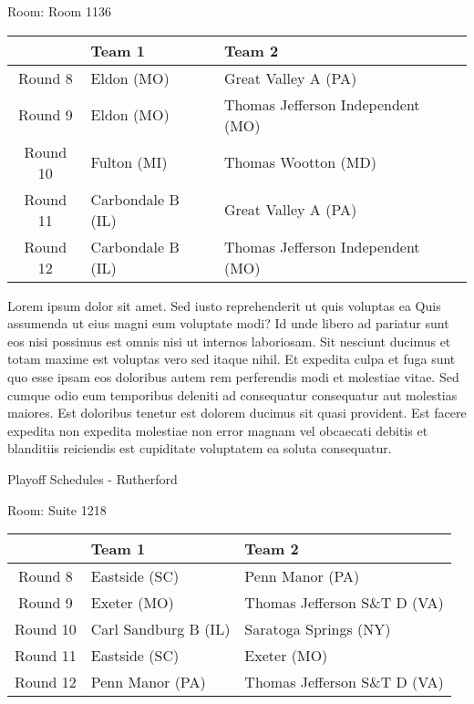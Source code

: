 \documentclass{article}%
\begin{document}
\linebreak%
\begin{flushleft}%
\begin{Large}%
Room: Room 1136%
\end{Large}%
\end{flushleft}%
\begin{tabularx}{\textwidth}{|c|Y|Y|}%
\hline%
&Team 1&Team 2\\%
\hline%
Round 8&Eldon (MO)&Great Valley A (PA)\\%
Round 9&Eldon (MO)&Thomas Jefferson Independent (MO)\\%
Round 10&Fulton (MI)&Thomas Wootton (MD)\\%
Round 11&Carbondale B (IL)&Great Valley A (PA)\\%
Round 12&Carbondale B (IL)&Thomas Jefferson Independent (MO)\\%
\hline%
\end{tabularx}%
\vspace*{8pt}%
\linebreak%
\newline%
Lorem ipsum dolor sit amet. Sed iusto reprehenderit ut quis voluptas ea Quis assumenda ut eius magni eum voluptate modi? Id unde libero ad pariatur sunt eos nisi possimus est omnis nisi ut internos laboriosam. Sit nesciunt ducimus et totam maxime est voluptas vero sed itaque nihil. Et expedita culpa et fuga sunt quo esse ipsam eos doloribus autem rem perferendis modi et molestiae vitae.\newline%
\newline%
Sed cumque odio eum temporibus deleniti ad consequatur consequatur aut molestias maiores. Est doloribus tenetur est dolorem ducimus sit quasi provident. Est facere expedita non expedita molestiae non error magnam vel obcaecati debitis et blanditiis reiciendis est cupiditate voluptatem ea soluta consequatur.%
\newpage%
\begin{center}%
\begin{Huge}%
Playoff Schedules {-} Rutherford%
\end{Huge}%
\end{center}%
\begin{flushleft}%
\begin{Large}%
Room: Suite 1218%
\end{Large}%
\end{flushleft}%
\begin{tabularx}{\textwidth}{|c|Y|Y|}%
\hline%
&Team 1&Team 2\\%
\hline%
Round 8&Eastside (SC)&Penn Manor (PA)\\%
Round 9&Exeter (MO)&Thomas Jefferson S\&T D (VA)\\%
Round 10&Carl Sandburg B (IL)&Saratoga Springs (NY)\\%
Round 11&Eastside (SC)&Exeter (MO)\\%
Round 12&Penn Manor (PA)&Thomas Jefferson S\&T D (VA)\\%
\hline%
\end{tabularx}%
\end{document}
